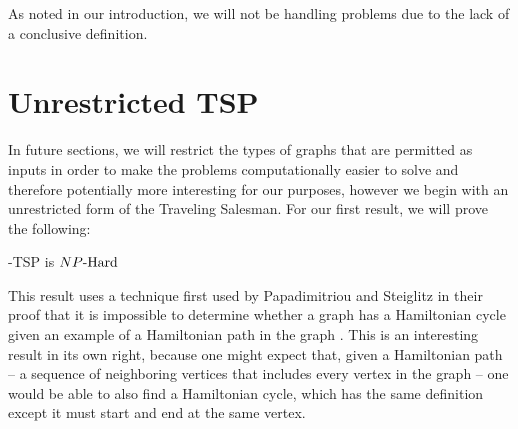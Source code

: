 As noted in our introduction, we will not be handling \inb{} problems due to the lack of a conclusive definition.

\section{Unrestricted TSP}
In future sections, we will restrict the types of graphs that are permitted as inputs in order to make the problems computationally easier to solve and therefore potentially more interesting for our purposes, however we begin with an unrestricted form of the Traveling Salesman. For our first result, we will prove the following:

\begin{theorem}
    \inob{}-TSP is ${NP\text{-Hard{}}}$
\end{theorem}

This result uses a technique first used by Papadimitriou and Steiglitz in their proof that it is impossible to determine whether a graph has a Hamiltonian cycle given an example of a Hamiltonian path in the graph \cite{nphard}. This is an interesting result in its own right, because one might expect that, given a Hamiltonian path -- a sequence of neighboring vertices that includes every vertex in the graph -- one would be able to also find a Hamiltonian cycle, which has the same definition except it must start and end at the same vertex. 


